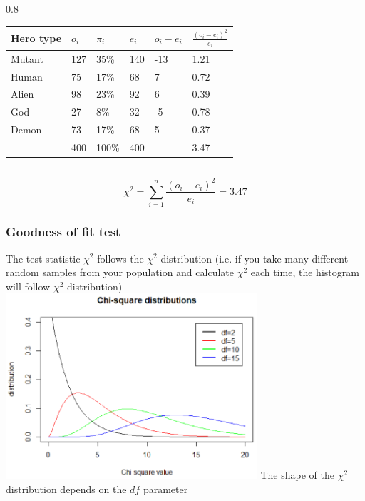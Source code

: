 \documentclass{beamer}
\begin{document}
\begin{frame}
\begin{columns}
    \begin{column} { 0.8 \textwidth}
\begin{table}[h]
\begin{tabular}{@{}llllll@{}}
\toprule
\textbf{Hero type} & $o_i$ & $\pi_i$ & $e_i$ & $o_i -e_i$ & $\frac{(o_i-e_i)^{2}}{e_i}$ \\ \midrule
Mutant                  & 127          & 35\%           & 140          & -13             & 1.21                           \\
Human                    & 75           & 17\%           & 68           & 7               & 0.72                           \\
Alien                   & 98           & 23\%           & 92           & 6               & 0.39                           \\
God                     & 27           & 8\%            & 32           & -5              & 0.78                           \\
Demon                   & 73           & 17\%           & 68           & 5               & 0.37                           \\ \bottomrule
 & 400 & 100\% & 400 & & 3.47 \\
\end{tabular}
\end{table}
    \end{column}
  \end{columns}
  \[ \chi^{2} = \sum_{i=1}^{n} \frac{(o_{i} - e_{i})^{2}}{e_{i}} = 3.47\]
\end{frame}


\begin{frame}
  \frametitle{Goodness of fit test}
    The test statistic $\chi^{2}$ follows the $\chi^{2}$ distribution
    (i.e. if you take many different random samples from your population
    and calculate $\chi^2$ each time,
    the histogram will follow $\chi^2$ distribution)
\vfill
    \includegraphics[width=0.7\textwidth]{img/chap6-chi-square-distributions.png}
\vfill
    The shape of the $\chi^{2}$ distribution depends on the $df$ parameter
\end{frame}
\end{document}
